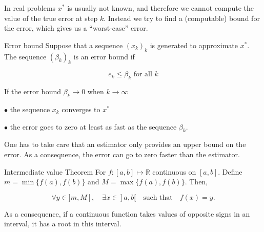 \documentclass{article}
\begin{document}
        \vspace{30pt}

        \noindent
        In real problems $x^*$ is usually not known, and therefore we cannot compute the value of the true error at step $k$. Instead we try to find a (computable) bound for the error, which gives us a “worst-case” error.

        \vspace{10pt}

        \begin{definition}{Error bound}
            Suppose that a sequence $(x_k)_k$ is generated to approximate $x^*$. The sequence $(\beta_k)_k$ is an error bound if

            $$e_k\leq\beta_k \text{ for all } k$$
        \end{definition}

        \vspace{10pt}

        \begin{other}{If the error bound $\beta_k \rightarrow 0$ when $k\to \infty$}

            $\bullet$ the sequence $x_k$ converges to $x^*$
            
            $\bullet$ the error goes to zero at least as fast as the sequence $\beta_k$.
            \vspace{4pt}

            One has to take care that an estimator only provides an upper bound on the error. As a consequence, the error can go to zero faster than the estimator.
        \end{other}

        \vspace{10pt}

        \begin{theorem}{Intermediate value Theorem}
            For $f: [a,b]\mapsto \mathbb{R}$ continuous on $[a,b]$. Define $m=\min\{f(a),f(b) \}$ and $M=\max\{f(a),f(b) \}$. Then,
            
            $$
            \forall y \in ]m,M[,\quad{} \exists x\in]a,b[\quad{} \text{such that}\quad{} f(x)=y.
            $$
            
            As a consequence, if a continuous function takes values of opposite signs in an interval, it has a root in this interval.
        \end{theorem}

        \vspace{10pt}
\end{document}

